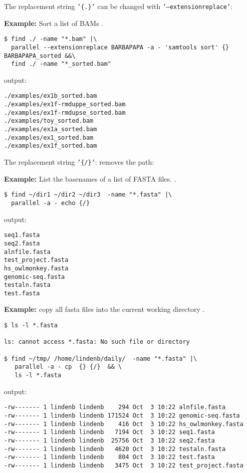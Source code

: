 \documentclass{article}
\newcommand{\example}[1]{
\textbf{Example: } {\color[rgb]{0,0,1} #1 } .
}
\begin{document}
The replacement string \texttt{'\{.\}'} can be changed with  \texttt{'--extensionreplace'}:
\example{Sort a list of BAMs}
\begin{lstlisting}
$ find ./ -name "*.bam" |\
  parallel --extensionreplace BARBAPAPA -a - 'samtools sort' {} BARBAPAPA_sorted &&\
  find ./ -name "*_sorted.bam"
\end{lstlisting}
output:
\begin{lstlisting}
./examples/ex1b_sorted.bam
./examples/ex1f-rmduppe_sorted.bam
./examples/ex1f-rmdupse_sorted.bam
./examples/toy_sorted.bam
./examples/ex1a_sorted.bam
./examples/ex1_sorted.bam
./examples/ex1f_sorted.bam
\end{lstlisting}



The replacement string \texttt{'\{/\}'}: removes the path:
\example{List the basenames of a list of FASTA files.}
\begin{lstlisting}
$ find ~/dir1 ~/dir2 ~/dir3  -name "*.fasta" |\
  parallel -a - echo {/}
\end{lstlisting}
output:
\begin{lstlisting}
seq1.fasta
seq2.fasta
alnfile.fasta
test_project.fasta
hs_owlmonkey.fasta
genomic-seq.fasta
testaln.fasta
test.fasta
\end{lstlisting}

\example{copy all fasta files into the current working directory}
\begin{lstlisting}
$ ls -l *.fasta

ls: cannot access *.fasta: No such file or directory

$ find ~/tmp/ /home/lindenb/daily/  -name "*.fasta" |\
   parallel -a - cp  {} {/}  && \
   ls -l *.fasta
\end{lstlisting}
output:
\begin{lstlisting}
-rw------- 1 lindenb lindenb    294 Oct  3 10:22 alnfile.fasta
-rw------- 1 lindenb lindenb 171524 Oct  3 10:22 genomic-seq.fasta
-rw------- 1 lindenb lindenb    416 Oct  3 10:22 hs_owlmonkey.fasta
-rw------- 1 lindenb lindenb   7194 Oct  3 10:22 seq1.fasta
-rw------- 1 lindenb lindenb  25756 Oct  3 10:22 seq2.fasta
-rw------- 1 lindenb lindenb   4620 Oct  3 10:22 testaln.fasta
-rw------- 1 lindenb lindenb    804 Oct  3 10:22 test.fasta
-rw------- 1 lindenb lindenb   3475 Oct  3 10:22 test_project.fasta
\end{lstlisting}
\end{document}
